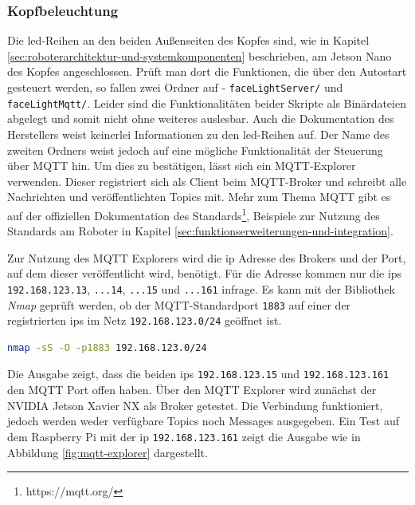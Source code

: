 \subsubsection{Kopfbeleuchtung}
\label{subsubsec:led}

Die \gls{led}-Reihen an den beiden Außenseiten des Kopfes sind, wie in Kapitel \ref{sec:roboterarchitektur-und-systemkomponenten}
beschrieben, am Jetson Nano des Kopfes angeschlossen.
Prüft man dort die Funktionen, die über den Autostart gesteuert werden, so fallen zwei Ordner auf - \texttt{faceLightServer/}
und \texttt{faceLightMqtt/}.
Leider sind die Funktionalitäten beider Skripte als Binärdateien abgelegt und somit nicht ohne weiteres auslesbar.
Auch die Dokumentation des Herstellers weist keinerlei Informationen zu den \gls{led}-Reihen auf.
Der Name des zweiten Ordners weist jedoch auf eine mögliche Funktionalität der Steuerung über MQTT hin.
Um dies zu bestätigen, lässt sich ein MQTT-Explorer verwenden.
Dieser registriert sich als Client beim MQTT-Broker und schreibt alle Nachrichten und veröffentlichten Topics mit.
Mehr zum Thema MQTT gibt es auf der offiziellen Dokumentation des Standards\footnote{https://mqtt.org/}, Beispiele zur Nutzung
des Standards am Roboter in Kapitel \ref{sec:funktionserweiterungen-und-integration}.

Zur Nutzung des MQTT Explorers wird die \gls{ip} Adresse des Brokers und der Port, auf dem dieser veröffentlicht wird, benötigt.
Für die Adresse kommen nur die \glspl{ip} \texttt{192.168.123.13}, \texttt{...14}, \texttt{...15} und \texttt{...161}
infrage.
Es kann mit der Bibliothek \emph{Nmap} geprüft werden, ob der MQTT-Standardport \texttt{1883} auf einer der registrierten \glspl{ip}
im Netz \texttt{192.168.123.0/24} geöffnet ist.

\begin{lstlisting}[language=Bash]
nmap -sS -O -p1883 192.168.123.0/24
\end{lstlisting}

\noindent Die Ausgabe zeigt, dass die beiden \glspl{ip}
\texttt{192\allowbreak .168\allowbreak .123\allowbreak .15} und \texttt{192\allowbreak .168\allowbreak .123\allowbreak .161} den MQTT Port offen haben.
Über den MQTT Explorer wird zunächst der NVIDIA Jetson Xavier NX als Broker getestet.
Die Verbindung funktioniert, jedoch werden weder verfügbare Topics noch Messages ausgegeben.
Ein Test auf dem Raspberry Pi mit der \gls{ip} \texttt{192.168.123.161} zeigt die Ausgabe wie in Abbildung \ref{fig:mqtt-explorer}
dargestellt.

